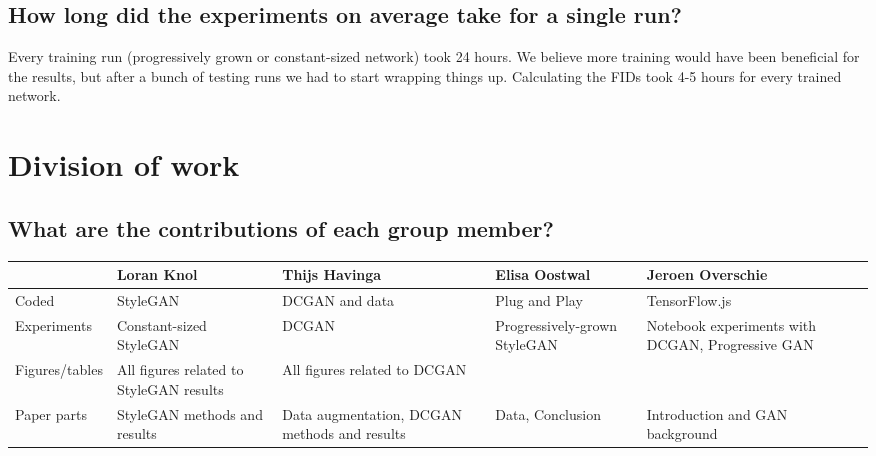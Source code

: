 \documentclass{article}
\begin{document}
\subsection{How long did the experiments on average take for a single run?}
Every training run (progressively grown or constant-sized network) took 24 hours. We believe more training would have been beneficial for the results, but after a bunch of testing runs we had to start wrapping things up. Calculating the FIDs took 4-5 hours for every trained network.

\section{Division of work}

\subsection{What are the contributions of each group member?}
\begin{table}[h!]
    \centering
    \begin{tabularx}{\linewidth}{l|X|X|X|X}
                        & Loran Knol                                & Thijs Havinga                     & Elisa Oostwal                 & Jeroen Overschie  \\
        \hline
        Coded           & StyleGAN                                  & DCGAN and data                    & Plug and Play                 & TensorFlow.js     \\
        \hline
        Experiments     & Constant-sized StyleGAN                   & DCGAN                             & Progressively-grown StyleGAN  &  Notebook experiments with DCGAN, Progressive GAN   \\
        \hline
        Figures/tables  & All figures related to StyleGAN results   & All figures related to DCGAN                                  &                               &                   \\
        \hline
        Paper parts     & StyleGAN methods and results              & Data augmentation, DCGAN methods and results   & Data, Conclusion                    & Introduction and GAN background             
    \end{tabularx}
    \label{tab:my_label}
\end{table}
\end{document}
